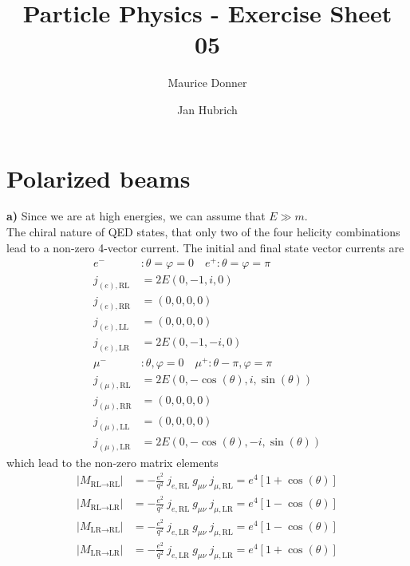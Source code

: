 \documentclass{article}
\title{\textsf{\color{blue!40!black}Particle Physics - Exercise Sheet 05}}
\author{Maurice Donner \and Jan Hubrich}
\begin{document}
\maketitle

\section{Polarized beams}

\textbf{a)} Since we are at high energies, we can assume that \( E \gg m \).\\
The chiral nature of QED states, that only two of the four helicity combinations
lead to a non-zero 4-vector current. The initial and final state vector currents
are
\begin{align}
    \nonumber e ^{-} &: \theta = \varphi = 0 \quad 
    \nonumber e ^{+} : \theta = \varphi = \pi \\
    \nonumber j _{(e ) , \text{RL}} &= 2 E \left( 0, -1, i , 0 \right) \\
    \nonumber j _{(e) , \text{RR}} &= ( 0, 0, 0, 0) \\
    \nonumber j _{(e) , \text{LL}} &= ( 0, 0, 0, 0) \\
    \nonumber j _{(e ) , \text{LR}} &= 2 E \left( 0, -1, -i , 0 \right) \\
    \nonumber \mu ^{-} &: \theta , \varphi = 0 \quad 
    \nonumber \mu ^{+} : \theta - \pi , \varphi = \pi \\
    \nonumber j _{(\mu ) , \text{RL}} &= 2 E \left( 0, - \cos \left( \theta \right)
    \nonumber , i , \sin \left( \theta \right) \right) \\
    \nonumber j _{(\mu) , \text{RR}} &= ( 0, 0, 0, 0) \\
    \nonumber j _{(\mu) , \text{LL}} &= ( 0, 0, 0, 0) \\
    j _{(\mu) , \text{LR}} &= 2 E \left( 0, - \cos \left( \theta \right)
    , -i , \sin \left( \theta \right) \right) 
\end{align}
which lead to the non-zero matrix elements
\begin{align}
    \left| M _{\text{RL} \rightarrow \text{RL}} \right|
    &= - \frac{e^2}{q^2} \ j _{e , \text{RL}} \ g _{\mu \nu} \
    j _{\mu , \text{RL}} =
    e^4 \left[ 1 + \cos \left( \theta \right) \right] \\
    \left| M _{\text{RL} \rightarrow \text{LR}} \right|
    &= - \frac{e^2}{q^2} \ j _{e , \text{RL}} \ g _{\mu \nu} \
    j _{\mu , \text{LR}} =
    e^4 \left[ 1 - \cos \left( \theta \right) \right] \\
    \left| M _{\text{LR} \rightarrow \text{RL}} \right|
    &= - \frac{e^2}{q^2} \ j _{e , \text{LR}} \ g _{\mu \nu} \
    j _{\mu , \text{RL}} =
    e^4 \left[ 1 - \cos \left( \theta \right) \right] \\
    \left| M _{\text{LR} \rightarrow \text{LR}} \right|
    &= - \frac{e^2}{q^2} \ j _{e , \text{LR}} \ g _{\mu \nu} \
    j _{\mu , \text{LR}} =
    e^4 \left[ 1 + \cos \left( \theta \right) \right]
\end{align}
\end{document}
